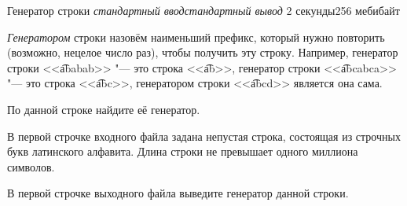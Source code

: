 
\begin{problem}{Генератор строки}
{\textsl{стандартный ввод}}{\textsl{стандартный вывод}}
{2 секунды}{256 мебибайт}{}

\textit{Генератором} строки назовём наименьший префикс, который нужно
повторить (возможно, нецелое число раз), чтобы получить эту строку.
Например, генератор строки <<\t{ababab}>> "--- это строка <<\t{ab}>>,
генератор строки <<\t{abcabca}>> "--- это строка <<\t{abc}>>, генератором
строки <<\t{abcd}>> является она сама.

По данной строке найдите её генератор.

\InputFile

В первой строчке входного файла задана непустая строка, состоящая
из строчных букв латинского алфавита. Длина строки не превышает
одного миллиона символов.

\OutputFile

В первой строчке выходного файла выведите генератор данной строки.

\Examples

\begin{example}
%
%
%
\end{example}

\end{problem}
